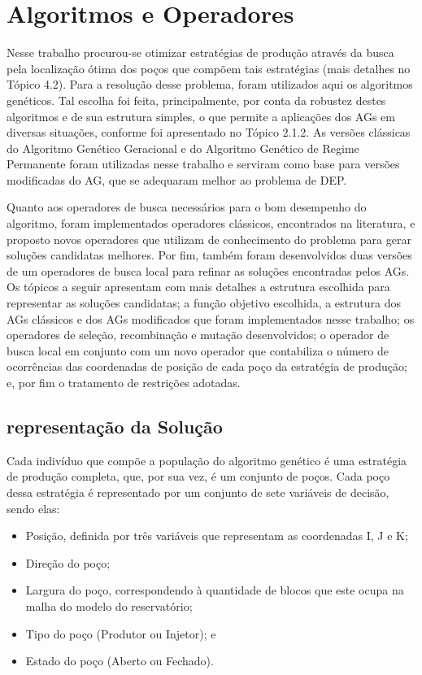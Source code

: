 \chapter{Algoritmos e Operadores}
\label{ch:ch3}
Nesse trabalho procurou-se otimizar estratégias de produção através da busca pela localização ótima dos poços que compõem tais estratégias (mais detalhes no Tópico 4.2). Para a resolução desse problema, foram utilizados aqui os algoritmos genéticos. Tal escolha foi feita, principalmente, por conta da robustez destes algoritmos e de sua estrutura simples, o que permite a aplicações dos AGs em diversas situações, conforme foi apresentado no Tópico 2.1.2. As versões clássicas do Algoritmo Genético Geracional e do Algoritmo Genético de Regime Permanente foram utilizadas nesse trabalho e serviram como base para versões modificadas do AG, que se adequaram melhor ao problema de DEP.

Quanto aos operadores de busca necessários para o bom desempenho do algoritmo, foram implementados operadores clássicos, encontrados na literatura, e proposto novos operadores que utilizam de conhecimento do problema para gerar soluções candidatas melhores. Por fim, também foram desenvolvidos duas versões de um operadores de busca local para refinar as soluções encontradas pelos AGs. Os tópicos a seguir apresentam com mais detalhes a estrutura escolhida para representar as soluções candidatas; a função objetivo escolhida, a estrutura dos AGs clássicos e dos AGs modificados que foram implementados nesse trabalho; os operadores de seleção, recombinação e mutação desenvolvidos; o operador de busca local em conjunto com um novo operador que contabiliza o número de ocorrências das coordenadas de posição de cada poço da estratégia de produção; e, por fim o tratamento de restrições adotadas.  

\section{representação da Solução}

Cada indivíduo que compõe a população do algoritmo genético é uma estratégia de produção completa, que, por sua vez, é um conjunto de poços. Cada poço dessa estratégia é representado por um conjunto de sete variáveis de decisão, sendo elas:

\begin{itemize}

\item Posição, definida por três variáveis que representam as coordenadas I, J e K;
\item Direção do poço;
\item Largura do poço, correspondendo à quantidade de blocos que este ocupa na malha do modelo do reservatório; 
\item Tipo do poço (Produtor ou Injetor); e
\item Estado do poço (Aberto ou Fechado).

\end{itemize}

